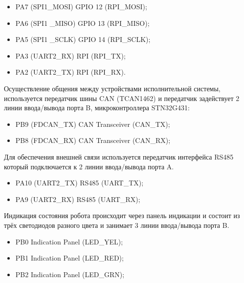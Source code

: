 \begin{itemize}
    \item PA7 (SPI1\_MOSI) \rightarrow GPIO 12 (RPI\_MOSI);
    \item PA6 (SPI1 \_MISO) \rightarrow GPIO 13 (RPI\_MISO);
    \item PA5 (SPI1 \_SCLK) \rightarrow GPIO 14 (RPI\_SCLK);
    \item PA3 (UART2\_RX) \rightarrow RPI (RPI\_TX);
    \item PA2 (UART2\_TX) \rightarrow RPI (RPI\_RX).
\end{itemize}

Осуществление общения между устройствами исполнительной системы, используется передатчик шины CAN (TCAN1462) и передатчик задействует 2 линии ввода/вывода порта B, микроконтроллера STN32G431:
\begin{itemize}
    \item PB9 (FDCAN\_TX) \rightarrow CAN Transceiver (CAN\_TX);
    \item PB8 (FDCAN\_RX) \rightarrow CAN Transceiver (CAN\_RX);
\end{itemize}

Для обеспечения внешней связи используется передатчик интерфейса RS485 который подключается к 2 линии ввода/вывода порта A.
\begin{itemize}
    \item PA10 (UART2\_TX) \rightarrow RS485 (UART\_TX);
    \item PA9 (UART2\_RX) \rightarrow RS485 (UART\_RX);
\end{itemize}

Индикация состояния робота происходит через панель индикации и состоит из трёх светодиодов разного цвета и занимает 3 линии ввода/вывода порта B. 
\begin{itemize}
    \item PB0 \leftarrow Indication Panel (LED\_YEL);
    \item PB1 \leftarrow Indication Panel (LED\_RED);
    \item PB2 \leftarrow Indication Panel (LED\_GRN);
\end{itemize}

